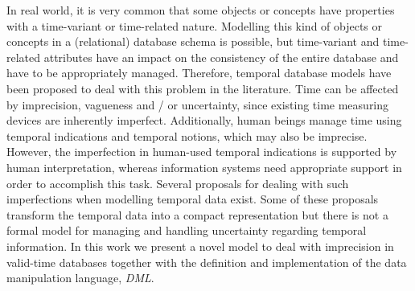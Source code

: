 %
%
In real world, it is very common that some objects or concepts have properties with a time-variant or time-related nature. Modelling this kind of objects or concepts in a (relational) database schema is possible, but time-variant and time-related attributes have an impact on the consistency of the entire database and have to be appropriately managed. Therefore, temporal database models have been proposed to deal with this problem in the literature. Time can be affected by imprecision, vagueness and / or  uncertainty, since existing time measuring devices are inherently imperfect. Additionally, human beings manage time using temporal indications and temporal notions, which may also be imprecise. However, the imperfection in human-used temporal indications is supported by human interpretation, whereas information systems need appropriate support in order to accomplish this task. Several proposals for dealing with such imperfections when modelling temporal data exist. Some of these proposals transform the temporal data into a compact representation but there is not a formal model for managing and handling uncertainty regarding temporal information.
In this work we present a novel model to deal with imprecision in valid-time databases together with the definition and implementation of the data manipulation language, \emph{DML}.
